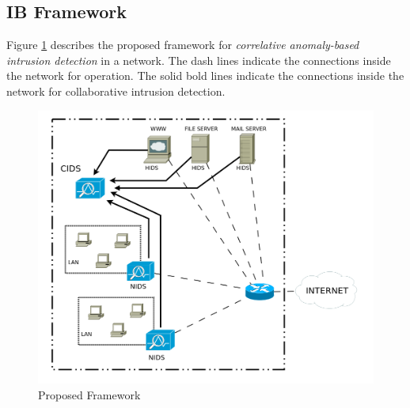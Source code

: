\documentclass[conference]{IEEEtran}
\begin{document}
\subsection{IB Framework}
Figure \ref{fw} describes the proposed framework for \emph{correlative anomaly-based intrusion detection} in a network.  The dash lines indicate the connections inside the network for operation.  The solid bold lines indicate the connections inside the network for collaborative intrusion detection.
\begin{figure}[h!]
\caption{Proposed Framework}
\label{fw}
\centering
\includegraphics[scale=0.12]{framework-v3}
\end{figure}
\end{document}
